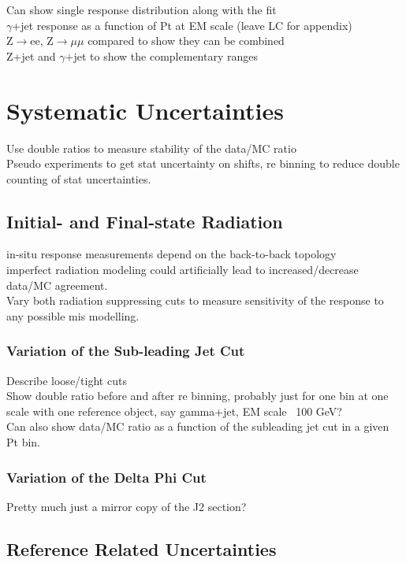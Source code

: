 Can show single response distribution along with the fit \\
$\gamma$+jet response as a function of Pt at EM scale (leave LC for appendix) \\
Z$\rightarrow$ee, Z$\rightarrow\mu\mu$ compared to show they can be combined \\
Z+jet and $\gamma$+jet to show the complementary ranges \\

\section{Systematic Uncertainties}

Use double ratios to measure stability of the data/MC ratio \\
Pseudo experiments to get stat uncertainty on shifts, re binning to reduce double counting of stat uncertainties.  

\subsection{Initial- and Final-state Radiation}
in-situ response measurements depend on the back-to-back topology \\
imperfect radiation modeling could artificially lead to increased/decrease data/MC agreement. \\
Vary both radiation suppressing cuts to measure sensitivity of the response to any possible mis modelling. \\
\subsubsection{Variation of the Sub-leading Jet Cut}
Describe loose/tight cuts\\
Show double ratio before and after re binning, probably just for one bin at one scale with one reference object, say gamma+jet, EM scale ~100 GeV? \\
Can also show data/MC ratio as a function of the subleading jet cut in a given Pt bin. \\
\subsubsection{Variation of the Delta Phi Cut}
Pretty much just a mirror copy of the J2 section?

\subsection{Reference Related Uncertainties}

